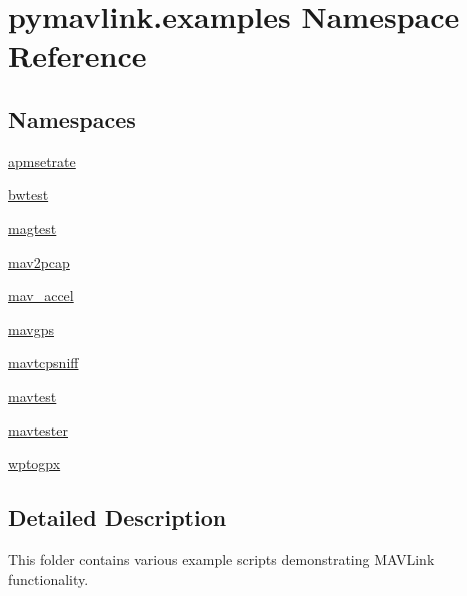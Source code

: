 \hypertarget{namespacepymavlink_1_1examples}{}\section{pymavlink.\+examples Namespace Reference}
\label{namespacepymavlink_1_1examples}
\subsection*{Namespaces}
\begin{DoxyCompactItemize}
\item 
 \mbox{\hyperlink{namespacepymavlink_1_1examples_1_1apmsetrate}{apmsetrate}}
\item 
 \mbox{\hyperlink{namespacepymavlink_1_1examples_1_1bwtest}{bwtest}}
\item 
 \mbox{\hyperlink{namespacepymavlink_1_1examples_1_1magtest}{magtest}}
\item 
 \mbox{\hyperlink{namespacepymavlink_1_1examples_1_1mav2pcap}{mav2pcap}}
\item 
 \mbox{\hyperlink{namespacepymavlink_1_1examples_1_1mav__accel}{mav\+\_\+accel}}
\item 
 \mbox{\hyperlink{namespacepymavlink_1_1examples_1_1mavgps}{mavgps}}
\item 
 \mbox{\hyperlink{namespacepymavlink_1_1examples_1_1mavtcpsniff}{mavtcpsniff}}
\item 
 \mbox{\hyperlink{namespacepymavlink_1_1examples_1_1mavtest}{mavtest}}
\item 
 \mbox{\hyperlink{namespacepymavlink_1_1examples_1_1mavtester}{mavtester}}
\item 
 \mbox{\hyperlink{namespacepymavlink_1_1examples_1_1wptogpx}{wptogpx}}
\end{DoxyCompactItemize}


\subsection{Detailed Description}
\begin{DoxyVerb}This folder contains various example scripts demonstrating MAVLink functionality.\end{DoxyVerb}
 